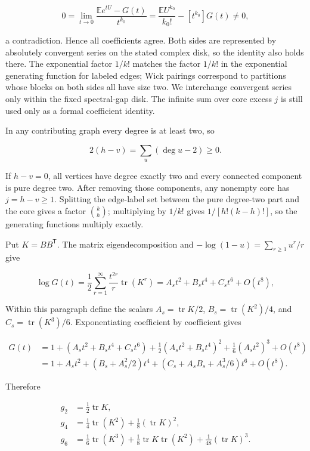 \documentclass[11pt,a4paper]{article}
\begin{document}
\[
0=\lim_{t\to0}\frac{\mathbb Ee^{tU}-G(t)}{t^{k_0}}
=\frac{\mathbb E U^{k_0}}{k_0!}-[t^{k_0}]G(t)\ne0,
\]

a contradiction. Hence all coefficients agree. Both sides are represented by absolutely convergent series on the stated complex disk, so the identity also holds there. The exponential factor \(1/k!\) matches the factor \(1/k!\) in the exponential generating function for labeled edges; Wick pairings correspond to partitions whose blocks on both sides all have size two. We interchange convergent series only within the fixed spectral-gap disk. The infinite sum over core excess \(j\) is still used only as a formal coefficient identity.

In any contributing graph every degree is at least two, so

\[
2(h-v)=\sum_{u}(\deg u-2)\ge0.
\]

If \(h-v=0\), all vertices have degree exactly two and every connected component is pure degree two. After removing those components, any nonempty core has \(j=h-v\ge1\). Splitting the edge-label set between the pure degree-two part and the core gives a factor \(\binom kh\); multiplying by \(1/k!\) gives \(1/[h!(k-h)!]\), so the generating functions multiply exactly.

Put \(K=BB^{\mathsf T}\). The matrix eigendecomposition and \(-\log(1-u)=\sum_{r\ge1}u^r/r\) give

\[
\log G(t)=\frac12\sum_{r=1}^{\infty}\frac{t^{2r}}r\operatorname{tr}(K^r)
=A_st^2+B_st^4+C_st^6+O(t^8),
\]

Within this paragraph define the scalars \(A_s=\operatorname{tr}K/2\), \(B_s=\operatorname{tr}(K^2)/4\), and \(C_s=\operatorname{tr}(K^3)/6\). Exponentiating coefficient by coefficient gives

\[
\begin{aligned}
G(t)
&=1+(A_st^2+B_st^4+C_st^6)
+\frac12(A_st^2+B_st^4)^2+\frac16(A_st^2)^3+O(t^8)\\
&=1+A_st^2+(B_s+A_s^2/2)t^4
+(C_s+A_sB_s+A_s^3/6)t^6+O(t^8).
\end{aligned}
\]

Therefore

\[
\begin{aligned}
g_2&=\tfrac12\operatorname{tr}K,\\
g_4&=\tfrac14\operatorname{tr}(K^2)+\tfrac18(\operatorname{tr}K)^2,\\
g_6&=\tfrac16\operatorname{tr}(K^3)
+\tfrac18\operatorname{tr}K\operatorname{tr}(K^2)
+\tfrac1{48}(\operatorname{tr}K)^3.
\end{aligned}
\]
\end{document}
